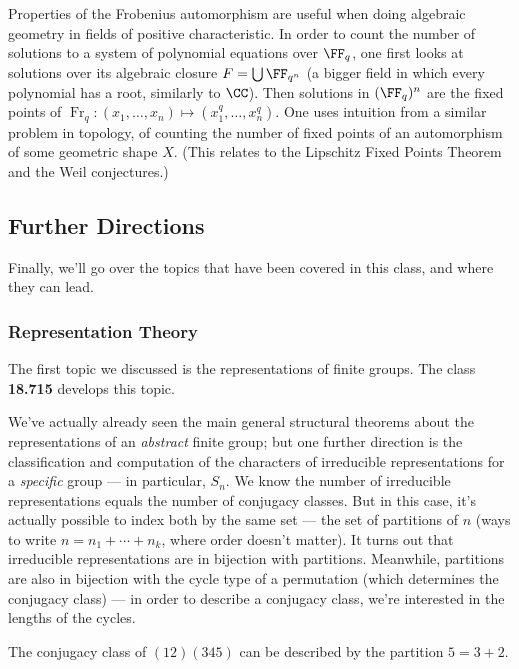 \begin{note}
    Properties of the Frobenius automorphism are useful when doing algebraic geometry in fields of positive characteristic. In order to count the number of solutions to a system of polynomial equations over $\FF_q$, one first looks at solutions over its algebraic closure $F = \bigcup \FF_{q^n}$ (a bigger field in which every polynomial has a root, similarly to $\CC$). Then solutions in $(\FF_q)^n$ are the fixed points of $\operatorname{Fr}_q : (x_1, \ldots, x_n) \mapsto (x_1^q, \ldots, x_n^q)$. 
    One uses intuition from a similar problem in topology, of counting the number of fixed points of an automorphism of some geometric shape $X$. (This relates to the Lipschitz Fixed Points Theorem and the Weil conjectures.)
\end{note}

\subsection{Further Directions}

Finally, we'll go over the topics that have been covered in this class, and where they can lead. 

\subsubsection{Representation Theory}

The first topic we discussed is the representations of finite groups. The class \textbf{18.715} develops this topic. 

We've actually already seen the main general structural theorems about the representations of an \emph{abstract} finite group; but one further direction is the classification and computation of the characters of irreducible representations for a \emph{specific} group --- in particular, $S_n$. We know the number of irreducible representations equals the number of conjugacy classes. But in this case, it's actually possible to index both by the same set --- the set of partitions of $n$ (ways to write $n = n_1 + \cdots + n_k$, where order doesn't matter). It turns out that irreducible representations are in bijection with partitions. Meanwhile, partitions are also in bijection with the cycle type of a permutation (which determines the conjugacy class) --- in order to describe a conjugacy class, we're interested in the lengths of the cycles. 

\begin{example}
The conjugacy class of $(12)(345)$ can be described by the partition $5 = 3 + 2$. 
\end{example}

